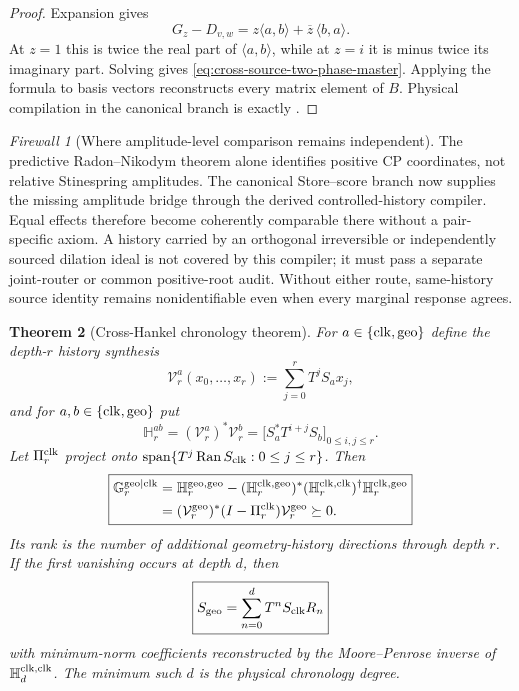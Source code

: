 \documentclass[11pt]{article}
\newtheorem{theorem}{Theorem}[section]
\theoremstyle{definition}
\theoremstyle{remark}
\newtheorem{firewall}[theorem]{Firewall}
\newcommand{\Span}{\operatorname{span}}
\newcommand{\Ran}{\operatorname{Ran}}
\begin{document}
\begin{proof}
Expansion gives
\[
 G_z-D_{v,w}
 =z\langle a,b\rangle+\overline z\,\langle b,a\rangle.
\]
At $z=1$ this is twice the real part of $\langle a,b\rangle$, while at $z=i$
it is minus twice its imaginary part.  Solving gives
\eqref{eq:cross-source-two-phase-master}.  Applying the formula to basis
vectors reconstructs every matrix element of $B$.  Physical compilation in
the canonical branch is exactly
.
\end{proof}

\begin{firewall}[Where amplitude-level comparison remains independent]
\label{fire:cross-source-nonidentifiability-master}
The predictive Radon--Nikodym theorem alone identifies positive CP
coordinates, not relative Stinespring amplitudes.  The canonical Store--score
branch now supplies the missing amplitude bridge through the derived
controlled-history compiler.  Equal effects therefore become coherently
comparable there without a pair-specific axiom.  A history carried by an
orthogonal irreversible or independently sourced dilation ideal is not
covered by this compiler; it must pass a separate joint-router or common
positive-root audit.  Without either route, same-history source identity
remains nonidentifiable even when every marginal response agrees.
\end{firewall}


\begin{theorem}[Cross-Hankel chronology theorem]
\label{thm:clock-geometry-cross-Hankel-master}
For $a\in\{{\rm clk},{\rm geo}\}$ define the depth-$r$ history synthesis
\[
 \mathcal V_r^a(x_0,\ldots,x_r)
 :=\sum_{j=0}^{r}T^jS_ax_j,
\]
and for $a,b\in\{{\rm clk},{\rm geo}\}$ put
\[
 \mathbb H_r^{ab}
 =(\mathcal V_r^a)^*\mathcal V_r^b
 =\bigl[S_a^*T^{i+j}S_b\bigr]_{0\le i,j\le r}.
\]
Let $\Pi_r^{\rm clk}$ project onto
$\Span\{T^j\Ran S_{\rm clk}:0\le j\le r\}$.  Then
\[
 \boxed{
 \begin{aligned}
 \mathbb G_r^{{\rm geo}\mid{\rm clk}}
 ={}&\mathbb H_r^{{\rm geo},{\rm geo}}
 -(\mathbb H_r^{{\rm clk},{\rm geo}})^*
  (\mathbb H_r^{{\rm clk},{\rm clk}})^\dagger
  \mathbb H_r^{{\rm clk},{\rm geo}}\\
 ={}&(\mathcal V_r^{\rm geo})^*
 (I-\Pi_r^{\rm clk})\mathcal V_r^{\rm geo}\succeq0.
 \end{aligned}}
\]
Its rank is the number of additional geometry-history directions through depth
$r$.  If the first vanishing occurs at depth $d$, then
\[
 \boxed{S_{\rm geo}=\sum_{n=0}^{d}T^nS_{\rm clk}R_n}
\]
with minimum-norm coefficients reconstructed by the Moore--Penrose inverse of
$\mathbb H_d^{{\rm clk},{\rm clk}}$.  The minimum such $d$ is the physical
chronology degree.
\end{theorem}
\end{document}
